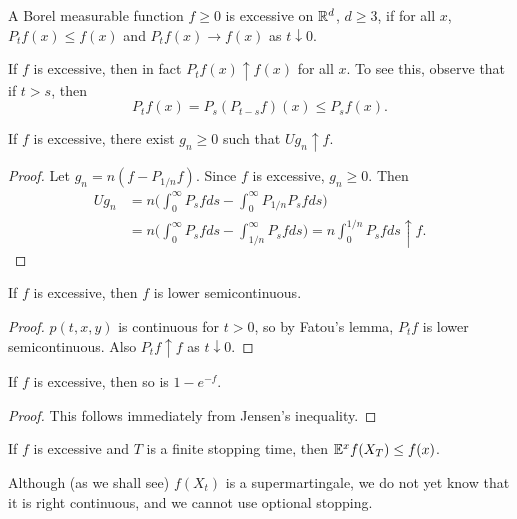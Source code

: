 \begin{definition}\label{def:ch2_6.1}
A Borel measurable function $f \geq 0$ is excessive on $\mathbb{R}^d$, $d \geq 3$, if for all $x$, $P_tf(x) \leq f(x)$ and $P_tf(x) \to f(x)$ as $t \downarrow 0$.
\end{definition}

If $f$ is excessive, then in fact $P_tf(x) \uparrow f(x)$ for all $x$. To see this, observe that if $t > s$, then
\[
    P_tf(x) = P_s(P_{t-s}f)(x) \leq P_sf(x).
\]

\begin{proposition}\label{prop:ch2_6.2}
If $f$ is excessive, there exist $g_n \geq 0$ such that $Ug_n \uparrow f$.
\end{proposition}

\begin{proof}
Let $g_n = n(f - P_{1/n}f)$. Since $f$ is excessive, $g_n \geq 0$. Then
\begin{align*}
    Ug_n &= n\Big(\int_0^\infty P_sf ds - \int_0^\infty P_{1/n}P_sf ds\Big) \\
    &= n\Big(\int_0^\infty P_sf ds - \int_{1/n}^\infty P_sf ds\Big) = n\int_0^{1/n} P_sf ds \uparrow f.
\end{align*}
\end{proof}

\begin{proposition}\label{prop:ch2_6.3}
If $f$ is excessive, then $f$ is lower semicontinuous.
\end{proposition}

\begin{proof}
$p(t,x,y)$ is continuous for $t > 0$, so by Fatou's lemma, $P_tf$ is lower semicontinuous. Also $P_tf \uparrow f$ as $t \downarrow 0$.
\end{proof}

\begin{proposition}\label{prop:ch2_6.4}
If $f$ is excessive, then so is $1 - e^{-f}$.
\end{proposition}

\begin{proof}
This follows immediately from Jensen's inequality.
\end{proof}

\begin{proposition}\label{prop:ch2_6.5}
If $f$ is excessive and $T$ is a finite stopping time, then $\mathbb{E}^x f(X_T) \leq f(x)$.
\end{proposition}

Although (as we shall see) $f(X_t)$ is a supermartingale, we do not yet know that it is right continuous, and we cannot use optional stopping.

